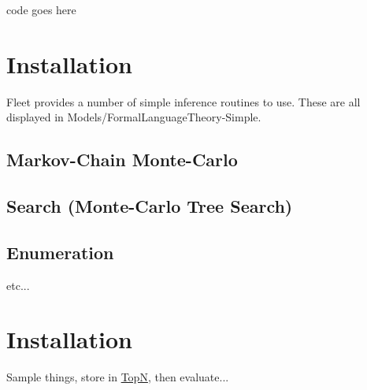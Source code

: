 \begin{DoxyCode}
code goes here
\end{DoxyCode}
\hypertarget{index_install_sec}{}\section{Installation}\label{index_install_sec}
Fleet provides a number of simple inference routines to use. These are all displayed in Models/\+Formal\+Language\+Theory-\/\+Simple.\hypertarget{index_step1}{}\subsection{Markov-\/\+Chain Monte-\/\+Carlo}\label{index_step1}
\hypertarget{index_step2}{}\subsection{Search (\+Monte-\/\+Carlo Tree Search)}\label{index_step2}
\hypertarget{index_step3}{}\subsection{Enumeration}\label{index_step3}
etc...\hypertarget{index_install_sec}{}\section{Installation}\label{index_install_sec}

\begin{DoxyItemize}
\item Sample things, store in \hyperlink{class_top_n}{TopN}, then evaluate... 
\end{DoxyItemize}